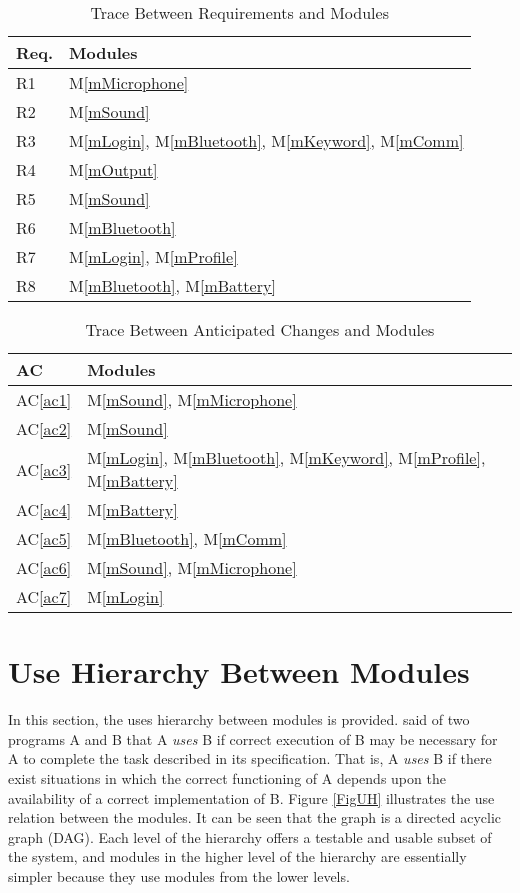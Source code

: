 \documentclass[12pt, titlepage]{article}
\newcommand{\acref}[1]{AC\ref{#1}}
\newcommand{\mref}[1]{M\ref{#1}}
\begin{document}
\begin{table}[H]
\centering
\begin{tabular}{p{} p{}}
\toprule
\textbf{Req.} & \textbf{Modules}\\
\midrule

R1 & \mref{mMicrophone}\\
R2 & \mref{mSound}\\
R3 & \mref{mLogin}, \mref{mBluetooth}, \mref{mKeyword}, \mref{mComm} \\
R4 & \mref{mOutput}\\
R5 & \mref{mSound}\\
R6 & \mref{mBluetooth}\\
R7 &  \mref{mLogin}, \mref{mProfile}\\
R8 & \mref{mBluetooth}, \mref{mBattery}\\
\bottomrule
\end{tabular}
\caption{Trace Between Requirements and Modules}
\label{TblRT}
\end{table}

\begin{table}[H]
\centering
\begin{tabular}{p{} p{}}
\toprule
\textbf{AC} & \textbf{Modules}\\
\midrule
\acref{ac1} & \mref{mSound}, \mref{mMicrophone}\\
\acref{ac2} & \mref{mSound}\\
\acref{ac3} & \mref{mLogin}, \mref{mBluetooth}, \mref{mKeyword}, \mref{mProfile}, \mref{mBattery}\\
\acref{ac4} & \mref{mBattery}\\
\acref{ac5} & \mref{mBluetooth}, \mref{mComm}\\
\acref{ac6} & \mref{mSound}, \mref{mMicrophone}\\
\acref{ac7} & \mref{mLogin}\\
\bottomrule
\end{tabular}
\caption{Trace Between Anticipated Changes and Modules}
\label{TblACT}
\end{table}

\section{Use Hierarchy Between Modules} \label{SecUse}

In this section, the uses hierarchy between modules is
provided. \citet{Parnas1978} said of two programs A and B that A {\em uses} B if
correct execution of B may be necessary for A to complete the task described in
its specification. That is, A {\em uses} B if there exist situations in which
the correct functioning of A depends upon the availability of a correct
implementation of B.  Figure \ref{FigUH} illustrates the use relation between
the modules. It can be seen that the graph is a directed acyclic graph
(DAG). Each level of the hierarchy offers a testable and usable subset of the
system, and modules in the higher level of the hierarchy are essentially simpler
because they use modules from the lower levels.
\end{document}
